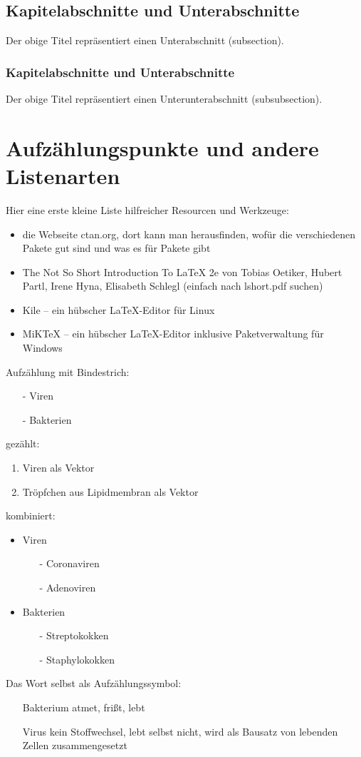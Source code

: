 \subsection{Kapitelabschnitte und Unterabschnitte}

Der obige Titel repräsentiert einen Unterabschnitt (subsection).

\subsubsection{Kapitelabschnitte und Unterabschnitte}

Der obige Titel repräsentiert einen Unterunterabschnitt (subsubsection).

\section{Aufzählungspunkte und andere Listenarten}

Hier eine erste kleine Liste hilfreicher Resourcen und Werkzeuge:
\begin{itemize}
\item die Webseite ctan.org, dort kann man herausfinden, wofür die verschiedenen Pakete gut sind und was es für Pakete gibt
\item \glqq The Not So Short Introduction To LaTeX 2e\grqq{} von Tobias Oetiker, Hubert Partl, Irene Hyna, Elisabeth Schlegl (einfach nach lshort.pdf suchen)
\item Kile -- ein hübscher LaTeX-Editor für Linux
\item MiKTeX -- ein hübscher LaTeX-Editor inklusive Paketverwaltung für Windows
\end{itemize}

Aufzählung mit Bindestrich:
\begin{itemize}
\item[-] Viren
\item[-] Bakterien
\end{itemize}

gezählt:
\begin{enumerate}
\item Viren als Vektor
\item Tröpfchen aus Lipidmembran als Vektor
\end{enumerate}

kombiniert:
\begin{itemize}
\item Viren
\begin{itemize}
\item[-] Coronaviren
\item[-] Adenoviren
\end{itemize}
\item Bakterien
\begin{itemize}
\item[-] Streptokokken
\item[-] Staphylokokken
\end{itemize}
\end{itemize}

Das Wort selbst als Aufzählungssymbol:
\begin{itemize}
\item[Bakterium] atmet, frißt, lebt
\item[Virus] kein Stoffwechsel, lebt selbst nicht, wird als Bausatz von lebenden Zellen zusammengesetzt
\end{itemize}
